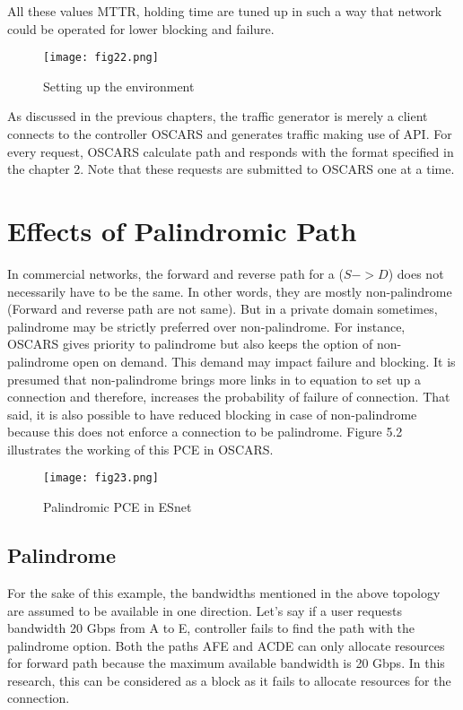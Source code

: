 \indent All these values MTTR, holding time are tuned up in such a way that network could be operated for lower blocking and failure.
	
\begin{figure}[hbt!]
\centering
\texttt{[image: fig22.png]}
\caption{Setting up the environment}
\label{fig:setEnv}
\end{figure}

	As discussed in the previous chapters, the traffic generator is merely a client connects to the controller OSCARS and generates traffic making use of API. For every request, 
OSCARS calculate path and responds with the format specified in the chapter 2. Note that these requests are submitted to OSCARS one at a time. 

\section {Effects of Palindromic Path}

	In commercial networks, the forward and reverse path for a {($S->D$)} does not necessarily have to be the same. In other words, they are mostly non-palindrome (Forward and reverse path are not same). But in a private domain sometimes, palindrome may be strictly preferred over non-palindrome. For instance, OSCARS gives priority to palindrome but also keeps the option of non-palindrome open on demand. This demand may impact failure and blocking. It is presumed that non-palindrome brings more links in to equation to set up a connection and therefore, increases the probability of failure of connection. That said, it is also possible to have reduced blocking in case of non-palindrome because this does not enforce a connection to be palindrome. Figure 5.2 illustrates the working of this PCE in OSCARS.


\begin{figure}[hbt!]
\centering
\texttt{[image: fig23.png]}
\caption{Palindromic PCE in ESnet}
\label{fig:palinPCE}
\end{figure}

\subsection {Palindrome}
	For the sake of this example, the bandwidths mentioned in the above topology are assumed to be available in one direction. Let's say if a user requests bandwidth 20 Gbps from A to E, controller fails to find the path with the palindrome option. Both the paths AFE and ACDE can only allocate resources for forward path because the maximum available bandwidth is 20 Gbps. In this research, this can be considered as a block as it fails to allocate resources for the connection. 

